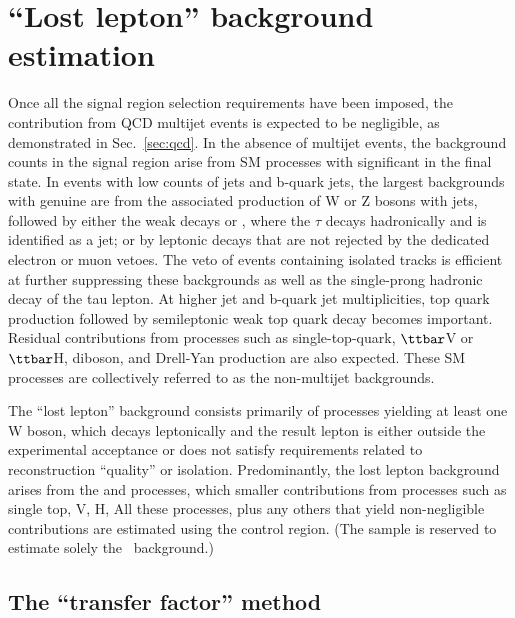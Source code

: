 
\section{``Lost lepton'' background estimation}
\label{sec:ttw}

Once all the signal region selection requirements have been imposed,
the contribution from QCD multijet events is expected to be
negligible, as demonstrated in Sec.~\ref{sec:qcd}. In the absence of
multijet events, the background counts in the signal region arise from
SM processes with significant \met in the final state. In events with
low counts of jets and b-quark jets, the largest backgrounds with
genuine \met are from the associated production of W or Z bosons with
jets, followed by either the weak decays \znunu or \wtaunu, where the
$\tau$ decays hadronically and is identified as a jet; or by leptonic
decays that are not rejected by the dedicated electron or muon
vetoes. The veto of events containing isolated tracks is efficient at
further suppressing these backgrounds as well as the single-prong
hadronic decay of the tau lepton. At higher jet and b-quark jet
multiplicities, top quark production followed by semileptonic weak top
quark decay becomes important.  Residual contributions from processes
such as single-top-quark, $\ttbar$V or $\ttbar$H, diboson, and
Drell-Yan production are also expected. These SM processes are
collectively referred to as the non-multijet backgrounds. 

The ``lost lepton'' background consists primarily of processes
yielding at least one W boson, which decays leptonically and the
result lepton is either outside the experimental acceptance or does
not satisfy requirements related to reconstruction ``quality'' or
isolation. Predominantly, the lost lepton background arises from the
\wj and \ttbar processes, which smaller contributions from processes
such as single top, {\ttbar}V, {\ttbar}H, \etc All these processes,
plus any others that yield non-negligible contributions are estimated
using the \mj control region. (The \mmj sample is reserved to estimate
solely the \znunu\ background.)

\subsection{The ``transfer factor'' method}
\label{sec:tf-method-ttw}

